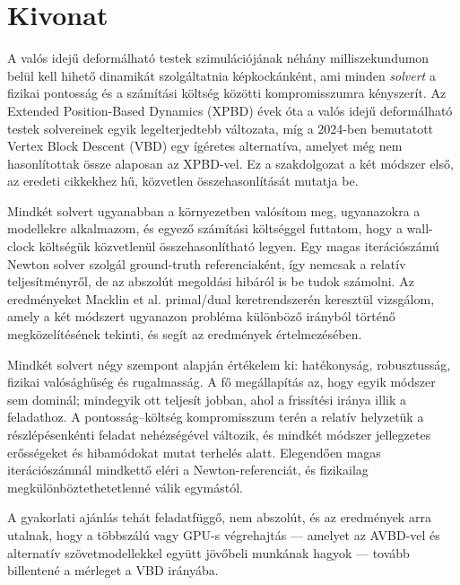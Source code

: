 \setcounter{page}{1}

\selecthungarian

\chapter*{Kivonat}

A valós idejű deformálható testek szimulációjának néhány milliszekundumon belül
kell hihető dinamikát szolgáltatnia képkockánként, ami minden \textit{solvert} a
fizikai pontosság és a számítási költség közötti kompromisszumra kényszerít. Az
Extended Position-Based Dynamics (XPBD) évek óta a valós idejű deformálható
testek solvereinek egyik legelterjedtebb változata, míg a 2024-ben bemutatott Vertex Block Descent
(VBD) egy ígéretes alternatíva, amelyet még nem hasonlítottak össze
alaposan az XPBD-vel. Ez a szakdolgozat a két
módszer első, az eredeti cikkekhez hű, közvetlen összehasonlítását mutatja be.

Mindkét solvert ugyanabban a környezetben valósítom meg, ugyanazokra a
modellekre alkalmazom, és egyező számítási költséggel futtatom, hogy
a wall-clock költségük közvetlenül összehasonlítható legyen. Egy
magas iterációszámú Newton solver szolgál ground-truth referenciaként, így nemcsak a
relatív teljesítményről, de az abszolút
megoldási hibáról is be tudok számolni. Az
eredményeket Macklin et al. primal/dual keretrendszerén keresztül vizsgálom,
amely a két módszert ugyanazon probléma különböző irányból történő
megközelítésének tekinti, és segít az eredmények értelmezésében.

Mindkét solvert négy szempont alapján értékelem ki: hatékonyság, robusztusság,
fizikai valósághűség és rugalmasság. A fő megállapítás az, hogy egyik módszer sem
dominál; mindegyik ott teljesít jobban, ahol a frissítési iránya illik a feladathoz. A
pontosság--költség kompromisszum terén a relatív helyzetük a részlépésenkénti
feladat nehézségével változik, és mindkét módszer jellegzetes erősségeket és
hibamódokat mutat terhelés alatt. Elegendően magas iterációszámnál mindkettő eléri a
Newton-referenciát, és fizikailag megkülönböztethetetlenné válik egymástól.

A gyakorlati ajánlás tehát feladatfüggő, nem abszolút, és az eredmények
arra utalnak, hogy a többszálú vagy GPU-s végrehajtás --- amelyet az AVBD-vel
és alternatív szövetmodellekkel együtt jövőbeli munkának hagyok --- tovább
billentené a mérleget a VBD irányába.


